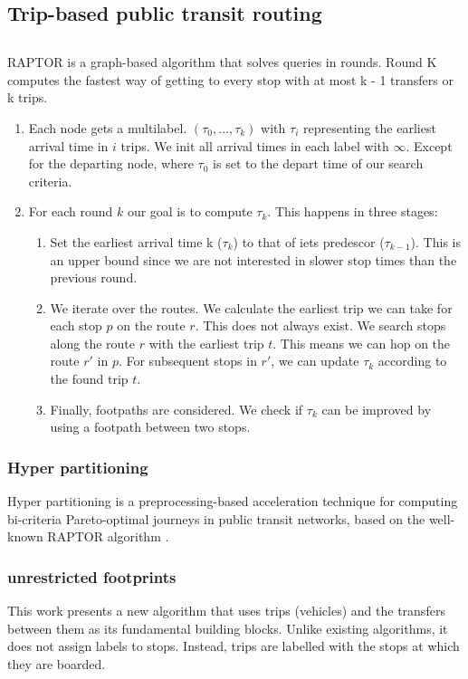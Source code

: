 \subsection{Trip-based public transit routing}

\subsection{}
RAPTOR is a graph-based algorithm that solves queries in rounds. Round K computes the fastest way of getting to every stop with at most k - 1 transfers or k trips.

\begin{enumerate}
    \item Each node gets a multilabel. $(\tau_0,...,\tau_k)$ with $\tau_i$ representing the earliest arrival time in $i$ trips. We init all arrival times in each label with $\infty$. Except for the departing node, where $\tau_0$ is set to the depart time of our search criteria.
    \item For each round $k$ our goal is to compute $\tau_k$. This happens in three stages:\begin{enumerate}
        \item Set the earliest arrival time k ($\tau_k$) to that of iets predescor ($\tau_{k-1}$). This is an upper bound since we are not interested in slower stop times than the previous round.
        \item We iterate over the routes. We calculate the earliest trip we can take for each stop $p$ on the route $r$. This does not always exist. We search stops along the route $r$ with the earliest trip $t$. This means we can hop on the route $r'$ in $p$. For subsequent stops in $r'$, we can update $\tau_k$ according to the found trip $t$.
        \item Finally, footpaths are considered. We check if $\tau_k$ can be improved by using a footpath between two stops. 
    \end{enumerate}
\end{enumerate}

\subsubsection{Hyper partitioning}
Hyper partitioning is a preprocessing-based acceleration technique for computing bi-criteria Pareto-optimal journeys in public transit networks, based on the well-known RAPTOR algorithm \cite{delling_round-based_2015}.
\subsubsection{unrestricted footprints}
This work presents a new algorithm that uses trips (vehicles) and the transfers between them as its fundamental building blocks. Unlike existing algorithms, it does not assign labels to stops. Instead, trips are labelled with the stops at which they are boarded.
